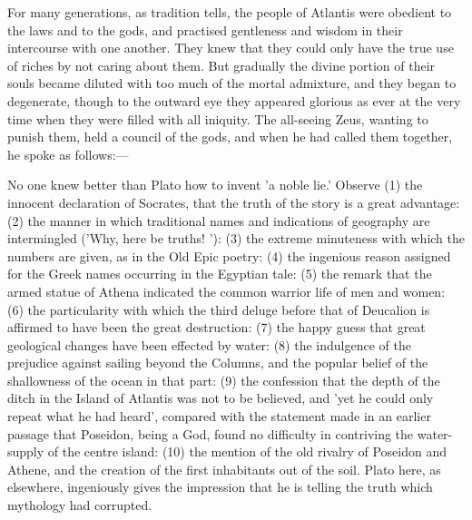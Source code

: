 \documentclass[11pt,letter]{article}
\begin{document}
\par  For many generations, as tradition tells, the people of Atlantis were obedient to the laws and to the gods, and practised gentleness and wisdom in their intercourse with one another. They knew that they could only have the true use of riches by not caring about them. But gradually the divine portion of their souls became diluted with too much of the mortal admixture, and they began to degenerate, though to the outward eye they appeared glorious as ever at the very time when they were filled with all iniquity. The all-seeing Zeus, wanting to punish them, held a council of the gods, and when he had called them together, he spoke as follows:—

\par  No one knew better than Plato how to invent 'a noble lie.' Observe (1) the innocent declaration of Socrates, that the truth of the story is a great advantage: (2) the manner in which traditional names and indications of geography are intermingled ('Why, here be truths! '): (3) the extreme minuteness with which the numbers are given, as in the Old Epic poetry: (4) the ingenious reason assigned for the Greek names occurring in the Egyptian tale: (5) the remark that the armed statue of Athena indicated the common warrior life of men and women: (6) the particularity with which the third deluge before that of Deucalion is affirmed to have been the great destruction: (7) the happy guess that great geological changes have been effected by water: (8) the indulgence of the prejudice against sailing beyond the Columns, and the popular belief of the shallowness of the ocean in that part: (9) the confession that the depth of the ditch in the Island of Atlantis was not to be believed, and 'yet he could only repeat what he had heard', compared with the statement made in an earlier passage that Poseidon, being a God, found no difficulty in contriving the water-supply of the centre island: (10) the mention of the old rivalry of Poseidon and Athene, and the creation of the first inhabitants out of the soil. Plato here, as elsewhere, ingeniously gives the impression that he is telling the truth which mythology had corrupted.
\end{document}
